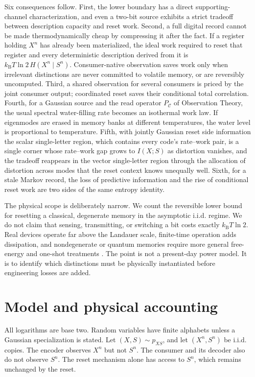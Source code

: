 \documentclass[letterpaper,onecolumn]{IEEEtran}
\theoremstyle{definition}
\theoremstyle{remark}
\newcommand{\PC}{P_{\mathcal{C}}}
\newcommand{\1}{\mathbf{1}}
\newcommand{\kb}{k_{\mathrm B}}
\begin{document}
Six consequences follow. First, the lower boundary has a direct
supporting-channel characterization, and even a two-bit source exhibits a
strict tradeoff between description capacity and reset work. Second, a full
digital record cannot be made thermodynamically cheap by compressing it after
the fact. If a register holding
$X^n$ has already been materialized, the ideal work required to reset that
register and every deterministic description derived from it is
$\kb T\ln2\,H(X^n\mid S^n)$. Consumer-native observation saves work only when
irrelevant distinctions are never committed to volatile memory, or are
reversibly uncomputed. Third, a shared observation for several consumers is
priced by the joint consumer output; coordinated reset saves their conditional
total correlation. Fourth, for a Gaussian source and the read operator
$\PC$ of Observation Theory, the usual spectral water-filling rate becomes an
isothermal work law. If eigenmodes are erased in memory banks at different
temperatures, the water level is proportional to temperature. Fifth, with
jointly Gaussian reset side information the scalar single-letter region, which
contains every code's rate--work pair, is a single corner whose rate--work gap grows to
$I(X;S)$ as distortion vanishes, and the
tradeoff reappears in the vector single-letter region through the allocation of distortion
across modes that the reset context knows unequally well. Sixth, for a
stale Markov record, the loss of predictive information and the rise of
conditional reset work are two sides of the same entropy identity.

The physical scope is deliberately narrow. We count the reversible lower bound
for resetting a classical, degenerate memory in the asymptotic i.i.d. regime.
We do not claim that sensing, transmitting, or switching a bit costs exactly
$\kb T\ln2$. Real devices operate far above the Landauer scale, finite-time
operation adds dissipation, and nondegenerate or quantum memories require more
general free-energy and one-shot treatments
\cite{sagawa2009,reeb2014,faist2015}. The point is not a present-day power model.
It is to identify which distinctions must be physically instantiated before
engineering losses are added.

\section{Model and physical accounting}\label{sec:model}

All logarithms are base two. Random variables have finite alphabets unless a
Gaussian specialization is stated. Let $(X,S)\sim p_{XS}$, and let
$(X^n,S^n)$ be i.i.d. copies. The encoder observes $X^n$ but not $S^n$. The
consumer and its decoder also do not observe $S^n$. The reset mechanism alone
has access to $S^n$, which remains unchanged by the reset.
\end{document}
